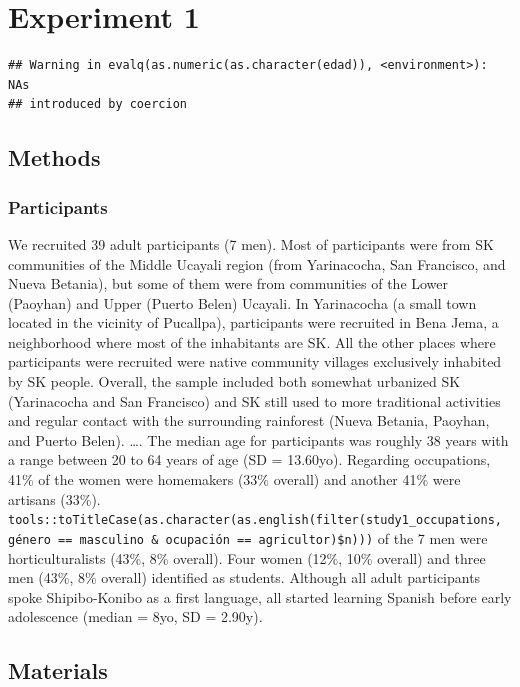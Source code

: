 \documentclass[man]{apa6}
\theoremstyle{definition}
\theoremstyle{definition}
\theoremstyle{definition}
\theoremstyle{remark}
\begin{document}
\section{Experiment 1}\label{experiment-1}

\begin{verbatim}
## Warning in evalq(as.numeric(as.character(edad)), <environment>): NAs
## introduced by coercion
\end{verbatim}

\subsection{Methods}\label{methods}

\subsubsection{Participants}\label{participants}

We recruited 39 adult participants (7 men). Most of participants were
from SK communities of the Middle Ucayali region (from Yarinacocha, San
Francisco, and Nueva Betania), but some of them were from communities of
the Lower (Paoyhan) and Upper (Puerto Belen) Ucayali. In Yarinacocha (a
small town located in the vicinity of Pucallpa), participants were
recruited in Bena Jema, a neighborhood where most of the inhabitants are
SK. All the other places where participants were recruited were native
community villages exclusively inhabited by SK people. Overall, the
sample included both somewhat urbanized SK (Yarinacocha and San
Francisco) and SK still used to more traditional activities and regular
contact with the surrounding rainforest (Nueva Betania, Paoyhan, and
Puerto Belen). \ldots{}. The median age for participants was roughly 38
years with a range between 20 to 64 years of age (SD = 13.60yo).
Regarding occupations, 41\% of the women were homemakers (33\% overall)
and another 41\% were artisans (33\%).
\texttt{tools::toTitleCase(as.character(as.english(filter(study1\_occupations,\ género\ ==\ \textquotesingle{}masculino\textquotesingle{}\ \&\ ocupación\ ==\ \textquotesingle{}agricultor\textquotesingle{})\$n)))}
of the 7 men were horticulturalists (43\%, 8\% overall). Four women
(12\%, 10\% overall) and three men (43\%, 8\% overall) identified as
students. Although all adult participants spoke Shipibo-Konibo as a
first language, all started learning Spanish before early adolescence
(median = 8yo, SD = 2.90y).

\subsection{Materials}\label{materials}
\end{document}

